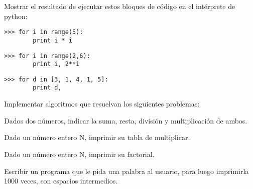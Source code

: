 
\begin{ejercicio}
Mostrar el resultado de ejecutar estos bloques de código en el
intérprete de python:
\begin{partes}
\item \begin{verbatim}
>>> for i in range(5):
        print i * i
\end{verbatim}
\item \begin{verbatim}
>>> for i in range(2,6):
        print i, 2**i
\end{verbatim}
\item \begin{verbatim}
>>> for d in [3, 1, 4, 1, 5]:
        print d,
\end{verbatim}
\end{partes}
\end{ejercicio}

\begin{ejercicio} Implementar algoritmos que resuelvan los siguientes
problemas:
\begin{partes}
  \item Dados dos números, indicar la suma, resta, división y multiplicación
  de ambos.
  \item Dado un número entero N, imprimir su tabla de multiplicar.
  \item Dado un número entero N, imprimir su factorial.
\end{partes}
\end{ejercicio}

\begin{ejercicio}
Escribir un programa que le pida una palabra al usuario, para luego
imprimirla 1000 veces, con espacios intermedios.
\end{ejercicio}
